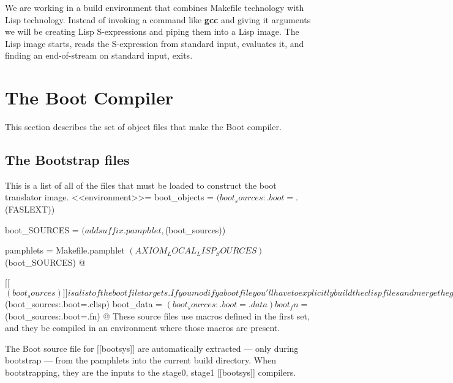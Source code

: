 \documentclass{article}
\begin{document}
We are working in a build environment that combines Makefile
technology with Lisp technology. Instead of invoking a command
like {\bf gcc} and giving it arguments we will be creating 
Lisp S-expressions and piping them into a Lisp image. The
Lisp image starts, reads the S-expression from standard input,
evaluates it, and finding an end-of-stream on standard input, exits.


\section{The Boot Compiler}
\label{sec:boot-compiler}

This section describes the set of object files that make the Boot compiler.

\subsection{The Bootstrap files}
\label{sec:boot-compiler:bootstrap}

This is a list of all of the files that must be loaded to construct the
boot translator image. 
<<environment>>= 
boot_objects = $(boot_sources:.boot=.$(FASLEXT))

boot_SOURCES = $(addsuffix .pamphlet, $(boot_sources))

pamphlets = Makefile.pamphlet $(AXIOM_LOCAL_LISP_SOURCES) $(boot_SOURCES)
@

[[$(boot_sources)]] is a list of the boot file targets. If you modify a
boot file you'll have to explicitly build the clisp files and
merge the generated code back into the pamphlet by hand. The
assumption is that if you know enough to change the fundamental
bootstrap files you know how to migrate the changes back.
This process, by design, does not occur automatically (though it
could).

The Boot compiler, [[bootsys]], is built from a set of source files
written in Boot.  Note that the order is 
important as earlier files will contain code needed by later files.
<<environment>>=
boot_sources = ptyout.boot btincl2.boot \
	btscan2.boot typrops.boot btpile2.boot \
	typars.boot tytree1.boot

boot_clisp = $(boot_sources:.boot=.clisp)
boot_data = $(boot_sources:.boot=.data)
boot_fn = $(boot_sources:.boot=.fn)
@
These source files use macros defined in the first set, and they be compiled
in an environment where those macros are present.



The Boot source file for [[bootsys]] are automatically extracted --- 
only during bootstrap --- from the pamphlets into the current build
directory.  When bootstrapping, they are the inputs to the stage0, stage1
 [[bootsys]] compilers.
\end{document}
